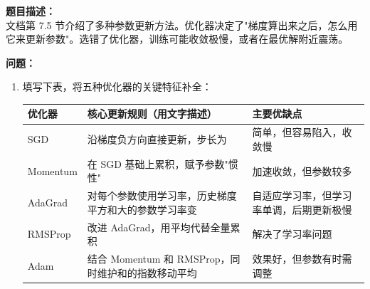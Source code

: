 \documentclass[a4paper,11pt]{ctexart}
\begin{document}
\begin{problembox}
    \textbf{题目描述：}\\
    文档第 7.5 节介绍了多种参数更新方法。优化器决定了"梯度算出来之后，怎么用它来更新参数"。选错了优化器，训练可能收敛极慢，或者在最优解附近震荡。

    \vspace{0.3cm}
    \textbf{问题：}
    \begin{enumerate}[(1)]
        \item 填写下表，将五种优化器的关键特征补全：

        \begin{center}
        \begin{tabular}{p{2.0cm} p{5.0cm} p{4.5cm}}
            \toprule
            优化器 & 核心更新规则（用文字描述） & 主要优缺点 \\
            \midrule
            SGD & 沿梯度负方向直接更新，步长为\underline{\hspace{1.0cm}} & 简单，但容易陷入\underline{\hspace{1.5cm}}，收敛慢 \\[1.5em]
            Momentum & 在 SGD 基础上累积\underline{\hspace{1.5cm}}，赋予参数"惯性" & 加速收敛，但\underline{\hspace{1.5cm}}参数较多 \\[1.5em]
            AdaGrad & 对每个参数使用\underline{\hspace{1.5cm}}学习率，历史梯度平方和大的参数学习率变\underline{\hspace{0.8cm}} & 自适应学习率，但学习率单调\underline{\hspace{1.0cm}}，后期更新极慢 \\[1.5em]
            RMSProp & 改进 AdaGrad，用\underline{\hspace{1.5cm}}平均代替全量累积 & 解决了学习率\underline{\hspace{1.5cm}}问题 \\[1.5em]
            Adam & 结合 Momentum 和 RMSProp，同时维护\underline{\hspace{1.5cm}}和\underline{\hspace{1.5cm}}的指数移动平均 & 效果好，但\underline{\hspace{1.5cm}}参数有时需调整 \\
            \bottomrule
        \end{tabular}
        \end{center}


\end{enumerate}
\end{problembox}
\end{document}
